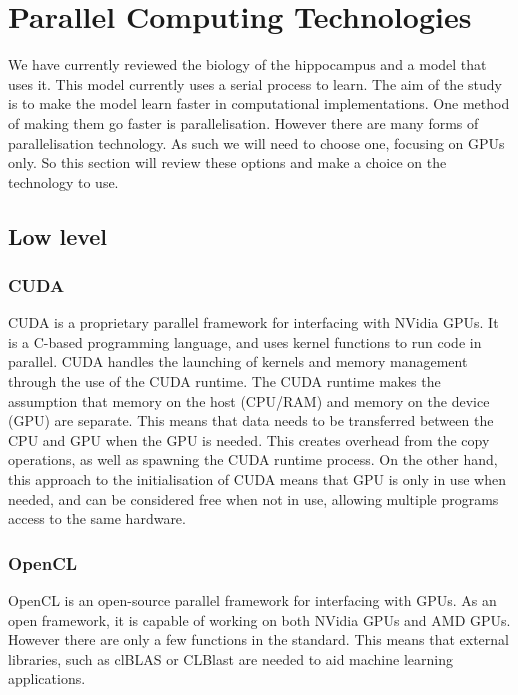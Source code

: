 \section{Parallel Computing Technologies}

We have currently reviewed the biology of the hippocampus and a model that uses it.
This model currently uses a serial process to learn.
The aim of the study is to make the model learn faster in computational implementations.
One method of making them go faster is parallelisation.
However there are many forms of parallelisation technology.
As such we will need to choose one, focusing on GPUs only.
So this section will review these options and make a choice on the technology to use.

\subsection{Low level}
\subsubsection{CUDA}
CUDA is a proprietary parallel framework for interfacing with NVidia GPUs.
It is a C-based programming language, and uses kernel functions to run code in parallel.
CUDA handles the launching of kernels and memory management through the use of the CUDA runtime\citep{nvidiacuda}.
The CUDA runtime makes the assumption that memory on the host (CPU/RAM) and memory on the device (GPU) are separate.
This means that data needs to be transferred between the CPU and GPU when the GPU is needed.
This creates overhead from the copy operations, as well as spawning the CUDA runtime process.
On the other hand, this approach to the initialisation of CUDA means that GPU is only in use when needed, and can be considered free when not in use, allowing multiple programs access to the same hardware. %

\subsubsection{OpenCL}
OpenCL is an open-source parallel framework for interfacing with GPUs. 
As an open framework, it is capable of working on both NVidia GPUs and AMD GPUs.
However there are only a few functions in the standard.
This means that external libraries, such as clBLAS \citep{clblas} or CLBlast \citep{clblast} are needed to aid machine learning applications.

